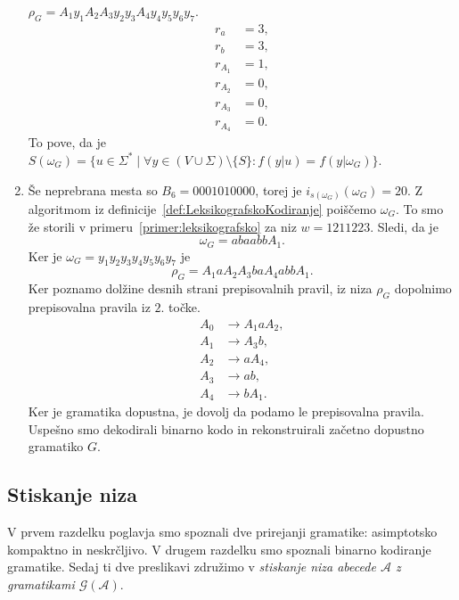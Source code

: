 \documentclass[fin1, tisk]{fmfdelo}
\newcommand{\A}{\mathcal{A}}
\newcommand{\G}{\mathcal{G}}
\theoremstyle{definition}
\begin{document}
\begin{primer}
\begin{enumerate}
        $\rho_G = A_1y_1A_2A_3y_2y_3A_4y_4y_5y_6y_7$.
        \begin{align*}
            r_a &= 3,\\
            r_b &= 3,\\
            r_{A_1} &= 1,\\
            r_{A_2} &= 0,\\
            r_{A_3} &= 0,\\
            r_{A_4} &= 0.
        \end{align*}
        To pove, da je $S(\omega_G) = \bigl\{ u \in \Sigma^* \mid \forall y \in (V \cup \Sigma) 
        \setminus \{ S \} \colon f(y|u) = f(y|\omega_G) \bigr\}$.
        \item Še neprebrana mesta so $B_6 = 0001010000$, torej je $i_{s(\omega_G)}(\omega_G) = 20$.
        Z algoritmom iz definicije~\ref{def:LeksikografskoKodiranje} poiščemo $\omega_G$. To smo 
        že storili v primeru~\ref{primer:leksikografsko} za niz $w = 1211223$. Sledi, da je
        \[
            \omega_G = abaabbA_1.
        \]
        Ker je $\omega_G = y_1y_2y_3y_4y_5y_6y_7$ je
        \[
            \rho_G = A_1aA_2A_3baA_4abbA_1.
        \]
        Ker poznamo dolžine desnih strani prepisovalnih pravil, iz niza $\rho_G$ dopolnimo 
        prepisovalna pravila iz $2.$ točke.
        \begin{align*}
            A_0 &\rightarrow A_1aA_2, \\
            A_1 &\rightarrow A_3b, \\
            A_2 &\rightarrow aA_4, \\
            A_3 &\rightarrow ab, \\
            A_4 &\rightarrow bA_1.
        \end{align*}
        Ker je gramatika dopustna, je dovolj da podamo le prepisovalna pravila. Uspešno smo
        dekodirali binarno kodo in rekonstruirali začetno dopustno gramatiko $G$.
    \end{enumerate}
\end{primer}

\subsection{Stiskanje niza}\label{subsection:StiskanjeNiza}

V prvem razdelku poglavja smo spoznali dve prirejanji gramatike: asimptotsko kompaktno in neskrčljivo.
V drugem razdelku smo spoznali binarno kodiranje gramatike. Sedaj ti dve preslikavi združimo v  
\emph{stiskanje niza abecede $\A$ z gramatikami $\G(\A)$}.
\end{document}
